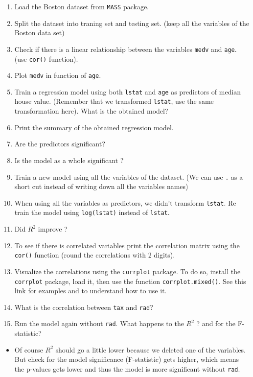 \documentclass[]{book}
\newenvironment{rmdblock}[1]
  {\begin{shaded*}
  \begin{itemize}
  \renewcommand{\labelitemi}{
    \raisebox{-.7\height}[0pt][0pt]{
      {\setkeys{Gin}{width=2em,keepaspectratio}\texttt{[image: img/icons/\#1]}}
    }
  }
  \item
  }
  {
  \end{itemize}
  \end{shaded*}
  }
\newenvironment{rmdinsight}
  {\begin{rmdblock}{insight}}
  {\end{rmdblock}}
\begin{document}
\begin{enumerate}
\def\labelenumi{\arabic{enumi}.}
\item
  Load the Boston dataset from \texttt{MASS} package.
\item
  Split the dataset into traning set and testing set. (keep all the
  variables of the Boston data set)
\item
  Check if there is a linear relationship between the variables
  \texttt{medv} and \texttt{age}. (use \texttt{cor()} function).
\item
  Plot \texttt{medv} in function of \texttt{age}.
\item
  Train a regression model using both \texttt{lstat} and \texttt{age} as
  predictors of median house value. (Remember that we transformed
  \texttt{lstat}, use the same transformation here). What is the
  obtained model?
\item
  Print the summary of the obtained regression model.
\item
  Are the predictors significant?
\item
  Is the model as a whole significant ?
\item
  Train a new model using all the variables of the dataset. (We can use
  \texttt{.} as a short cut instead of writing down all the variables
  names)
\item
  When using all the variables as predictors, we didn't transform
  \texttt{lstat}. Re train the model using \texttt{log(lstat)} instead
  of \texttt{lstat}.
\item
  Did \(R^2\) improve ?
\item
  To see if there is correlated variables print the correlation matrix
  using the \texttt{cor()} function (round the correlations with 2
  digits).
\item
  Visualize the correlations using the \texttt{corrplot} package. To do
  so, install the \texttt{corrplot} package, load it, then use the
  function \texttt{corrplot.mixed()}. See this
  \href{https://cran.r-project.org/web/packages/corrplot/vignettes/corrplot-intro.html}{link}
  for examples and to understand how to use it.
\item
  What is the correlation between \texttt{tax} and \texttt{rad}?
\item
  Run the model again without \texttt{rad}. What happens to the \(R^2\)
  ? and for the F-statistic?
\end{enumerate}

\begin{rmdinsight}
Of course \(R^2\) should go a little lower because we deleted one of the
variables. But check for the model significance (F-statistic) gets
higher, which means the p-values gets lower and thus the model is more
significant without \texttt{rad}.
\end{rmdinsight}
\end{document}
